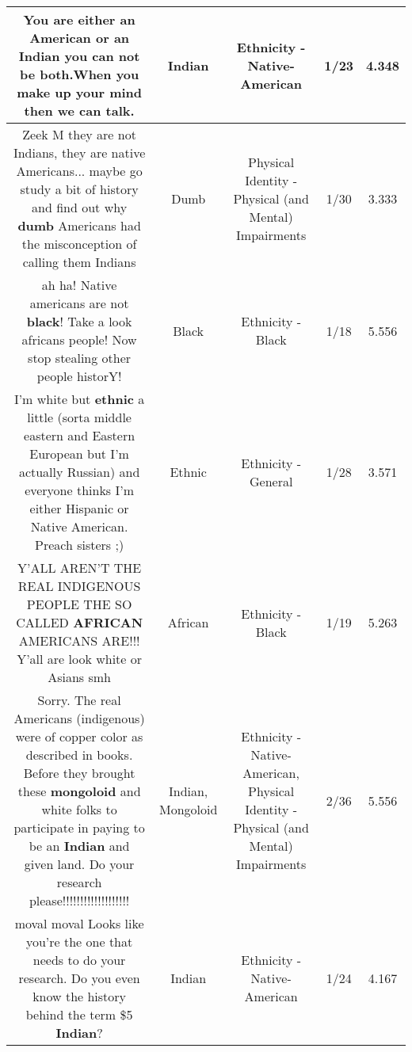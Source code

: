 \documentclass[11pt]{article}
\newlength\mylength
\begin{document}
\begin{center}
\begin{longtable}{|C{.65\mylength}|C{.30\mylength}|C{.12\mylength}|C{.12\mylength}|C{.12\mylength}|}
  \small You are either an American or an \textbf{Indian} you can not be both.When you make up your mind then we can talk.\normalsize   & Indian & Ethnicity - Native-American & 1/23 & 4.348 \\  \hline
  \small Zeek M they are not Indians, they are native Americans... maybe go study a bit of history and find out why \textbf{dumb} Americans had the misconception of calling them Indians\normalsize   & Dumb & Physical Identity - Physical (and Mental) Impairments & 1/30 & 3.333 \\  \hline
  \small ah ha! Native americans are not \textbf{black}! Take a look africans people! Now stop stealing other people historY!\normalsize   & Black & Ethnicity - Black & 1/18 & 5.556 \\  \hline
  \small I'm white but \textbf{ethnic} a little (sorta middle eastern and Eastern European but I'm actually Russian) and everyone thinks I'm either Hispanic or Native American. Preach sisters ;)\normalsize   & Ethnic & Ethnicity - General & 1/28 & 3.571 \\  \hline
  \small Y'ALL AREN'T THE REAL INDIGENOUS PEOPLE THE SO CALLED \textbf{AFRICAN} AMERICANS ARE!!! Y'all are look white or Asians smh\normalsize   & African & Ethnicity - Black & 1/19 & 5.263 \\  \hline
  \small Sorry. The real Americans (indigenous) were of copper color as described in books.  Before they brought these \textbf{mongoloid} and white folks to participate in paying to be an \textbf{Indian} and given land. Do your research please!!!!!!!!!!!!!!!!!!!\normalsize   & Indian, Mongoloid & Ethnicity - Native-American, Physical Identity - Physical (and Mental) Impairments & 2/36 & 5.556 \\  \hline
  \small moval moval Looks like you're the one that needs to do your research. Do you even know the history behind the term \$5 \textbf{Indian}?\normalsize   & Indian & Ethnicity - Native-American & 1/24 & 4.167 \\  \hline

\end{longtable}
\end{center}
\end{document}
